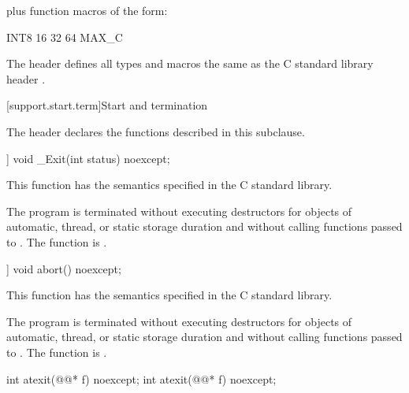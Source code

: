 plus function macros of the form:

\begin{codeblock}
  [U]INT{8 16 32 64 MAX}_C
\end{codeblock}

\pnum
The header defines all types and macros the same as
the C standard library header .


[support.start.term]{Start and termination}

\pnum
{}%
\begin{note}
The header 
declares the functions described in this subclause.
\end{note}

%
\begin{itemdecl}
[[noreturn]] void _Exit(int status) noexcept;
\end{itemdecl}

\begin{itemdescr}
\pnum
\effects
This function has the semantics specified in the C standard library.

\pnum
\remarks
The program is terminated without executing destructors for objects of automatic,
thread, or static storage duration and without calling functions passed to
.
%
The function  is .
\end{itemdescr}

%
\begin{itemdecl}
[[noreturn]] void abort() noexcept;
\end{itemdecl}

\begin{itemdescr}
\pnum
\effects
This function has the semantics specified in the C standard library.

\pnum
\remarks
The program is terminated without executing destructors for objects of
automatic, thread, or static storage
duration and without calling functions passed to
.
%
The function  is .
\end{itemdescr}

%
\begin{itemdecl}
int atexit(@@* f) noexcept;
int atexit(@@* f) noexcept;
\end{itemdecl}

